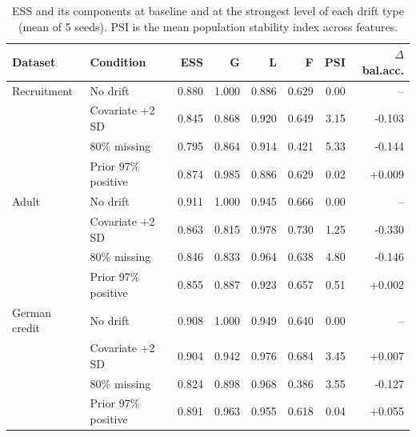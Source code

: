 \begin{table}[t]
\centering
\caption{ESS and its components at baseline and at the strongest level of each drift type (mean of 5 seeds). PSI is the mean population stability index across features.}
\label{tab:extremes}
\small
\setlength{\tabcolsep}{4pt}
\begin{tabular}{llrrrrrr}
\toprule
Dataset & Condition & ESS & G & L & F & PSI & $\Delta$bal.acc. \\
\midrule
Recruitment & No drift & 0.880 & 1.000 & 0.886 & 0.629 & 0.00 & -- \\
 & Covariate +2 SD & 0.845 & 0.868 & 0.920 & 0.649 & 3.15 & -0.103 \\
 & 80\% missing & 0.795 & 0.864 & 0.914 & 0.421 & 5.33 & -0.144 \\
 & Prior 97\% positive & 0.874 & 0.985 & 0.886 & 0.629 & 0.02 & +0.009 \\
Adult & No drift & 0.911 & 1.000 & 0.945 & 0.666 & 0.00 & -- \\
 & Covariate +2 SD & 0.863 & 0.815 & 0.978 & 0.730 & 1.25 & -0.330 \\
 & 80\% missing & 0.846 & 0.833 & 0.964 & 0.638 & 4.80 & -0.146 \\
 & Prior 97\% positive & 0.855 & 0.887 & 0.923 & 0.657 & 0.51 & +0.002 \\
German credit & No drift & 0.908 & 1.000 & 0.949 & 0.640 & 0.00 & -- \\
 & Covariate +2 SD & 0.904 & 0.942 & 0.976 & 0.684 & 3.45 & +0.007 \\
 & 80\% missing & 0.824 & 0.898 & 0.968 & 0.386 & 3.55 & -0.127 \\
 & Prior 97\% positive & 0.891 & 0.963 & 0.955 & 0.618 & 0.04 & +0.055 \\
\bottomrule
\end{tabular}
\end{table}
